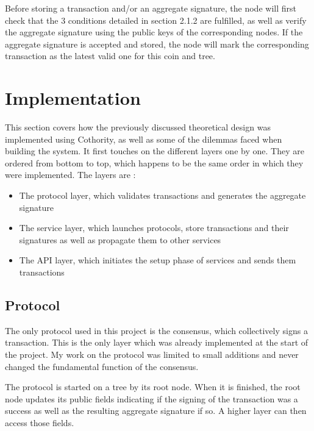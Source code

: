 \documentclass[11pt, a4paper, twoside, openright]{article}
\begin{document}
Before storing a transaction and/or an aggregate signature, the node will first check that the 3 conditions detailed in section 2.1.2 are fulfilled, as well as verify the aggregate signature using the public keys of the corresponding nodes. If the aggregate signature is accepted and stored, the node will mark the corresponding transaction as the latest valid one for this coin and tree.





\section{Implementation}
\label{Implementation}

This section covers how the previously discussed theoretical design was implemented using Cothority, as well as some of the dilemmas faced when building the system. It first touches on the different layers one by one. They are ordered from bottom to top, which happens to be the same order in which they were implemented. The layers are :
\begin{itemize}
\itemsep0em
\item The protocol layer, which validates transactions and generates the aggregate signature
\item The service layer, which launches protocols, store transactions and their signatures as well as propagate them to other services
\item The API layer, which initiates the setup phase of services and sends them transactions
\end{itemize}



\subsection{Protocol}

The only protocol used in this project is the consensus, which collectively signs a transaction. This is the only layer which was already implemented at the start of the project. My work on the protocol was limited to small additions and never changed the fundamental function of the consensus.

The protocol is started on a tree by its root node. When it is finished, the root node updates its public fields indicating if the signing of the transaction was a success as well as the resulting aggregate signature if so. A higher layer can then access those fields.
\end{document}
